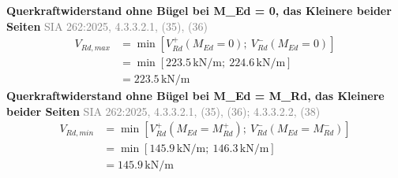 \documentclass[11pt,a4paper]{article}
\newcommand{\normref}[1]{{\small\textcolor{gray}{#1}}}
\begin{document}
\noindent\textbf{Querkraftwiderstand ohne Bügel bei M\_Ed = 0, das Kleinere beider Seiten} \hfill \normref{SIA 262:2025, 4.3.3.2.1, (35), (36)}
\begin{equation*}
\begin{aligned}
  V_{Rd,max} &= \min\left[V_{Rd}^{+}(M_{Ed} = 0);\ V_{Rd}^{-}(M_{Ed} = 0)\right] \\
  &= \min\left[223.5\,\mathrm{kN}/\mathrm{m};\ 224.6\,\mathrm{kN}/\mathrm{m}\right] \\
  &= 223.5\,\mathrm{kN}/\mathrm{m}
\end{aligned}
\end{equation*}
\noindent\textbf{Querkraftwiderstand ohne Bügel bei M\_Ed = M\_Rd, das Kleinere beider Seiten} \hfill \normref{SIA 262:2025, 4.3.3.2.1, (35), (36); 4.3.3.2.2, (38)}
\begin{equation*}
\begin{aligned}
  V_{Rd,min} &= \min\left[V_{Rd}^{+}(M_{Ed} = M_{Rd}^{+});\ V_{Rd}^{-}(M_{Ed} = M_{Rd}^{-})\right] \\
  &= \min\left[145.9\,\mathrm{kN}/\mathrm{m};\ 146.3\,\mathrm{kN}/\mathrm{m}\right] \\
  &= 145.9\,\mathrm{kN}/\mathrm{m}
\end{aligned}
\end{equation*}
\end{document}

